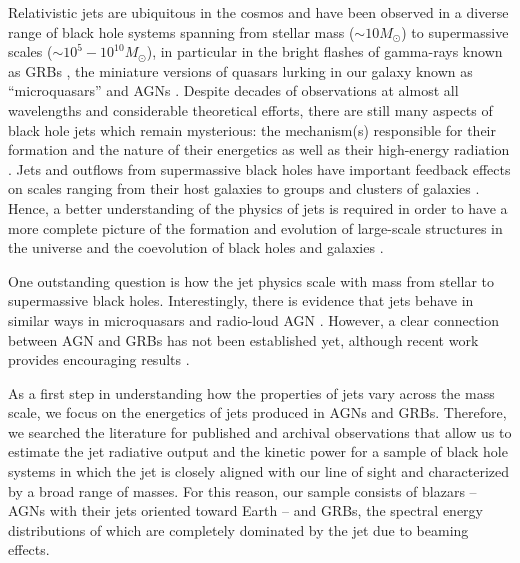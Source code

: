 \documentclass[12pt]{article}
\begin{document}












Relativistic jets are ubiquitous in the cosmos and have been observed in a diverse range of black hole systems spanning from stellar mass ($\sim 10 M_\odot$) to supermassive scales ($\sim 10^5-10^{10} M_\odot$), in particular in the bright flashes of gamma-rays known as GRBs \cite{gehrels09,piran04}, the miniature versions of quasars lurking in our galaxy known as ``microquasars'' \cite{mirabel99} and AGNs \cite{rees84,krolik}. 
Despite decades of observations at almost all wavelengths and considerable theoretical efforts, there are still many aspects of black hole jets which remain mysterious: the mechanism(s) responsible for their formation and the nature of their energetics as well as their high-energy radiation \cite{meier01, nar05}. 
Jets and outflows from supermassive black holes have important feedback effects on scales ranging from their host galaxies to groups and clusters of galaxies \cite{mcnamara07}. Hence, a better understanding of the physics of jets is required in order to have a more complete picture of the formation and evolution of large-scale structures in the universe and the coevolution of black holes and galaxies \cite{sijacki07}.

One outstanding question is how the jet physics scale with mass from stellar to supermassive black holes. Interestingly, there is evidence that jets behave in similar ways in microquasars and radio-loud AGN \cite{marscher02,merloni03,falcke04}. However, a clear connection between AGN and GRBs has not been established yet, although recent work provides encouraging results \cite{wang11,wu11}.

As a first step in understanding how the properties of jets vary across the mass scale, we focus on the energetics of jets produced in AGNs and GRBs. 
Therefore, we searched the literature for published and archival observations that allow us to estimate the jet radiative output and the kinetic power for a sample of black hole systems in which the jet is closely aligned with our line of sight and characterized by a broad range of masses. For this reason, our sample consists of blazars -- AGNs with their jets oriented toward Earth \cite{ulrich97} -- and GRBs, the spectral energy distributions of which are completely dominated by the jet due to beaming effects.
\end{document}
